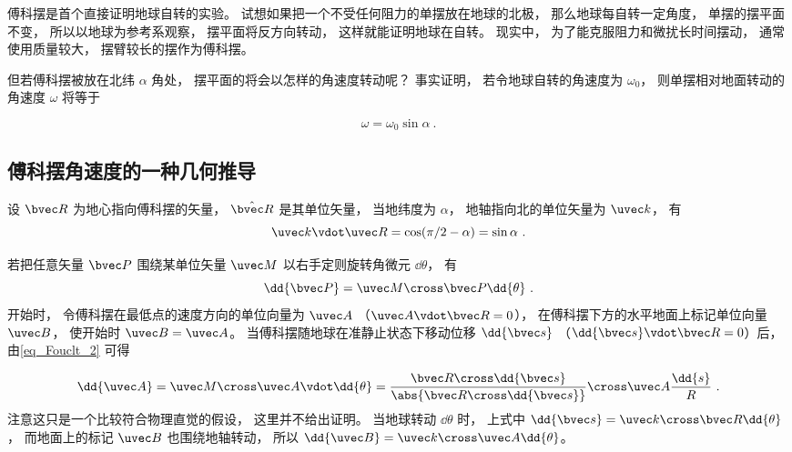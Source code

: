 

傅科摆是首个直接证明地球自转的实验。 试想如果把一个不受任何阻力的单摆放在地球的北极， 那么地球每自转一定角度， 单摆的摆平面不变， 所以以地球为参考系观察， 摆平面将反方向转动， 这样就能证明地球在自转。 现实中， 为了能克服阻力和微扰长时间摆动， 通常使用质量较大， 摆臂较长的摆作为傅科摆。

但若傅科摆被放在北纬 $\alpha$ 角处， 摆平面的将会以怎样的角速度转动呢？ 事实证明， 若令地球自转的角速度为 $\omega_0$， 则单摆相对地面转动的角速度 $\omega$ 将等于

\begin{equation}
\omega = \omega_0 \sin\alpha~.
\end{equation}

\subsection{傅科摆角速度的一种几何推导}
设 $\bvec R$ 为地心指向傅科摆的矢量， $\hat {\bvec R}$ 是其单位矢量， 当地纬度为 $\alpha$， 地轴指向北的单位矢量为 $\uvec k$， 有
\begin{equation}
\uvec k\vdot \uvec R = \cos(\pi/2 - \alpha) = \sin\alpha~.
\end{equation}

若把任意矢量 $\bvec P$ 围绕某单位矢量 $\uvec M$ 以右手定则旋转角微元 $\dd{\theta}$， 有
\begin{equation}\label{eq_Fouclt_2}
\dd{\bvec P} = \uvec M \cross \bvec P \dd{\theta}~.
\end{equation}
开始时， 令傅科摆在最低点的速度方向的单位向量为 $\uvec A$ （$\uvec A\vdot \bvec R = 0$）， 在傅科摆下方的水平地面上标记单位向量 $\uvec B$， 使开始时 $\uvec B = \uvec A$。 当傅科摆随地球在准静止状态下移动位移 $\dd{\bvec s}$ （$\dd{\bvec s} \vdot\bvec R = 0$）后， 由\autoref{eq_Fouclt_2} 可得

\begin{equation}
\dd{\uvec A} = \uvec M\cross \uvec A\vdot \dd{\theta} = 
\frac{\bvec R\cross \dd{\bvec s}}{\abs{\bvec R\cross \dd{\bvec s}}} \cross \uvec A \frac{\dd{s}}{R}~.
\end{equation}
注意这只是一个比较符合物理直觉的假设， 这里并不给出证明。 当地球转动 $\dd{\theta}$ 时， 上式中 $\dd{\bvec s} = \uvec k \cross \bvec R \dd{\theta}$， 而地面上的标记 $\uvec B$ 也围绕地轴转动， 所以 $\dd{\uvec B} = \uvec k \cross \uvec A \dd{\theta}$。

